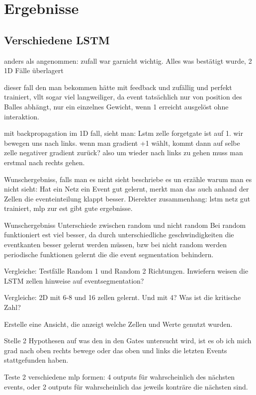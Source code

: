 \chapter{Ergebnisse}
\label{ch:untersuchung}

\section{Verschiedene LSTM }


anders als angenommen: zufall war garnicht wichtig. Alles was bestätigt wurde, 2 1D Fälle überlagert

dieser fall den man bekommen hätte mit feedback und zufällig und perfekt trainiert, vllt sogar viel langweiliger, da event tatsächlich nur von position des Balles abhängt, nur ein einzelnes Gewicht, wenn 1 erreicht ausgelöst ohne interaktion. 


mit backpropagation im 1D fall, sieht man: Lstm zelle forgetgate ist auf 1. wir bewegen uns nach links. wenn man gradient +1 wählt, kommt dann auf selbe zelle negativer gradient zurück? also um wieder nach links zu gehen muss man erstmal nach rechts gehen. 

Wunschergebniss, falls man es nicht sieht beschriebe es un erzähle warum man es nicht sieht: 
Hat ein Netz ein Event gut gelernt, merkt man das auch anhand der Zellen die eventeinteilung klappt besser.
Dierekter zusammenhang: lstm netz gut trainiert, mlp zur est gibt gute ergebnisse.

Wunschergebniss
Unterschiede zwischen random und nicht random
Bei random funktioniert est viel besser,  da  durch unterschiedliche geschwindigkeiten die eventkanten besser gelernt werden müssen, bzw bei nicht random werden periodische funktionen gelernt die die event segmentation behindern.

Vergleiche: Testfälle Random 1 und Random 2 Richtungen. Inwiefern weisen die LSTM zellen hinweise auf eventsegmentation? 

Vergleiche: 2D mit 6-8 und 16 zellen gelernt.
Und mit 4? Was ist die kritische Zahl?

Erstelle eine Ansicht, die anzeigt welche Zellen und Werte genutzt wurden.

Stelle 2 Hypothesen auf was den in den Gates untersucht wird, ist es ob ich mich grad nach oben rechts bewege oder das oben und links die letzten Events stattgefunden haben.

Teste 2 verschiedene mlp formen: 4 outputs für wahrscheinlich des nächsten events,
oder 2 outputs für wahrscheinlich das jeweils konträre die nächsten sind.


